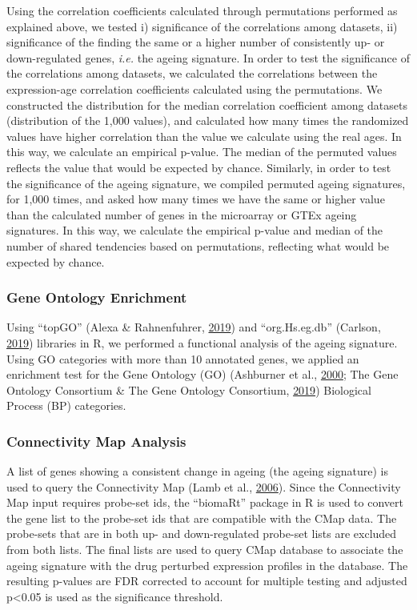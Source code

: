 \documentclass[12pt,twoside]{unicam}
\begin{document}
Using the correlation coefficients calculated through permutations performed as explained above, we tested i) significance of the correlations among datasets, ii) significance of the finding the same or a higher number of consistently up- or down-regulated genes, \emph{i.e.} the ageing signature. In order to test the significance of the correlations among datasets, we calculated the correlations between the expression-age correlation coefficients calculated using the permutations. We constructed the distribution for the median correlation coefficient among datasets (distribution of the 1,000 values), and calculated how many times the randomized values have higher correlation than the value we calculate using the real ages. In this way, we calculate an empirical p-value. The median of the permuted values reflects the value that would be expected by chance. Similarly, in order to test the significance of the ageing signature, we compiled permuted ageing signatures, for 1,000 times, and asked how many times we have the same or higher value than the calculated number of genes in the microarray or GTEx ageing signatures. In this way, we calculate the empirical p-value and median of the number of shared tendencies based on permutations, reflecting what would be expected by chance.

\hypertarget{gene-ontology-enrichment}{%
\subsubsection{Gene Ontology Enrichment}\label{gene-ontology-enrichment}}

Using ``topGO'' (Alexa \& Rahnenfuhrer, \protect\hyperlink{ref-Alexa2019}{2019}) and ``org.Hs.eg.db'' (Carlson, \protect\hyperlink{ref-Carlson2019}{2019}) libraries in R, we performed a functional analysis of the ageing signature. Using GO categories with more than 10 annotated genes, we applied an enrichment test for the Gene Ontology (GO) (Ashburner et al., \protect\hyperlink{ref-Ashburner2000}{2000}; The Gene Ontology Consortium \& The Gene Ontology Consortium, \protect\hyperlink{ref-The_Gene_Ontology_Consortium2019}{2019}) Biological Process (BP) categories.

\hypertarget{drugCMapMethod}{%
\subsubsection{Connectivity Map Analysis}\label{drugCMapMethod}}

A list of genes showing a consistent change in ageing (the ageing signature) is used to query the Connectivity Map (Lamb et al., \protect\hyperlink{ref-Lamb2006}{2006}). Since the Connectivity Map input requires probe-set ids, the ``biomaRt'' package in R is used to convert the gene list to the probe-set ids that are compatible with the CMap data. The probe-sets that are in both up- and down-regulated probe-set lists are excluded from both lists. The final lists are used to query CMap database to associate the ageing signature with the drug perturbed expression profiles in the database. The resulting p-values are FDR corrected to account for multiple testing and adjusted p\textless0.05 is used as the significance threshold.
\end{document}
